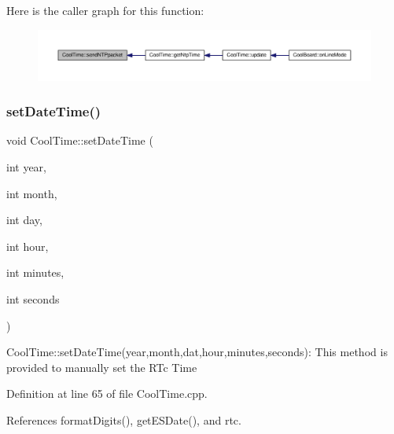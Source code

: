 Here is the caller graph for this function\+:
\nopagebreak
\begin{figure}[H]
\begin{center}
\leavevmode
\includegraphics[width=350pt]{classCoolTime_a236a38d120dc53bc67456d763838c5a1_icgraph}
\end{center}
\end{figure}
\mbox{\label{classCoolTime_ab81ea7fdaace111aa01cc1ec84c6d297}} 
\subsubsection{\texorpdfstring{set\+Date\+Time()}{setDateTime()}}
{\footnotesize\ttfamily void Cool\+Time\+::set\+Date\+Time (\begin{DoxyParamCaption}\item[{int}]{year,  }\item[{int}]{month,  }\item[{int}]{day,  }\item[{int}]{hour,  }\item[{int}]{minutes,  }\item[{int}]{seconds }\end{DoxyParamCaption})}

Cool\+Time\+::set\+Date\+Time(year,month,dat,hour,minutes,seconds)\+: This method is provided to manually set the R\+Tc Time 

Definition at line 65 of file Cool\+Time.\+cpp.



References format\+Digits(), get\+E\+S\+Date(), and rtc.



